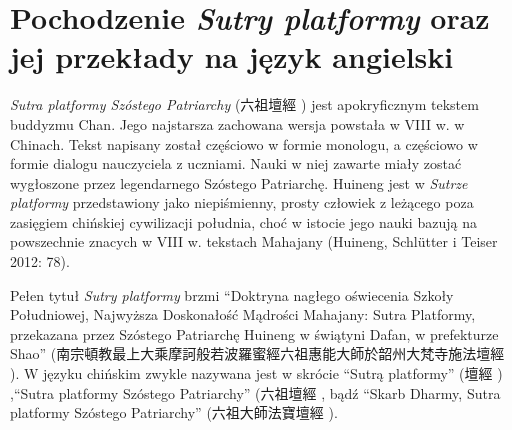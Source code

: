 \section{Pochodzenie \textit{Sutry platformy} oraz jej przekłady na język angielski}
\textit{Sutra platformy Szóstego Patriarchy} (六祖壇經 ) jest apokryficznym tekstem buddyzmu Chan.
Jego najstarsza zachowana wersja powstała w VIII w. w Chinach. Tekst napisany został częściowo w formie monologu, a częściowo w formie dialogu nauczyciela z uczniami.
Nauki w niej zawarte miały zostać wygłoszone przez legendarnego Szóstego Patriarchę.
Huineng jest w \textit{Sutrze platformy} przedstawiony jako niepiśmienny, prosty człowiek z leżącego poza zasięgiem chińskiej cywilizacji południa, choć w istocie jego nauki bazują na powszechnie znacych w VIII w. tekstach Mahajany
(Huineng, Schlütter i Teiser 2012: 78).

Pełen tytuł \textit{Sutry platformy} brzmi ``Doktryna nagłego oświecenia Szkoły Południowej, Najwyższa Doskonałość Mądrości Mahajany: Sutra Platformy, przekazana przez Szóstego Patriarchę Huineng w świątyni Dafan, w prefekturze Shao'' (南宗頓教最上大乘摩訶般若波羅蜜經六祖惠能大師於韶州大梵寺施法壇經 ).
W języku chińskim zwykle nazywana jest w skrócie ``Sutrą platformy'' (壇經 ) ,``Sutra platformy Szóstego Patriarchy'' (六祖壇經 , bądź ``Skarb Dharmy, Sutra platformy Szóstego Patriarchy'' (六祖大師法寶壇經 ).

